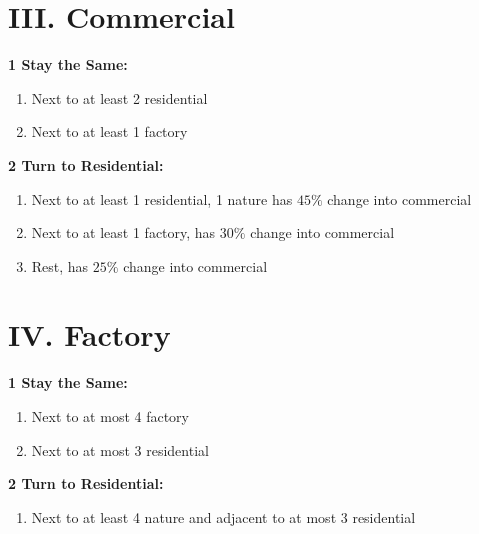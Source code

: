 \documentclass[a4paper,12pt]{report}
\begin{document}
\section*{III. Commercial}

\noindent
\textbf{1 Stay the Same: }

\begin{enumerate}
\item Next to at least 2 residential
\item Next to at least 1 factory
\end{enumerate}

\noindent
\textbf{2 Turn to Residential:}

\noindent
\begin{enumerate}
\item Next to at least 1 residential, 1 nature has $45\%$ change into commercial 
\item Next to at least 1 factory, has $30\%$ change into commercial
\item Rest, has $25\%$ change into commercial
\end{enumerate}

\section*{IV. Factory}

\noindent
\textbf{1 Stay the Same: }

\begin{enumerate}
\item Next to at most 4 factory
\item Next to at most 3 residential
\end{enumerate}

\noindent
\textbf{2 Turn to Residential:}

\noindent
\begin{enumerate}
\item Next to at least 4 nature and adjacent to at most 3 residential
\end{enumerate}
\end{document}
